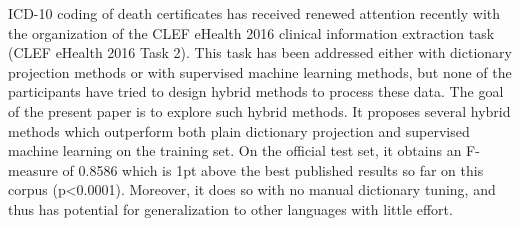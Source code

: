 ICD-10 coding of death certificates has received renewed attention recently with the organization of the CLEF eHealth 2016 clinical information extraction task (CLEF eHealth 2016 Task 2).  This task has been addressed either with dictionary projection methods or with supervised machine learning methods, but none of the participants have tried to design hybrid methods to process these data. The goal of the present paper is to explore such hybrid methods. It proposes several hybrid methods which outperform both plain dictionary projection and supervised machine learning on the training set. On the official test set, it obtains an F-measure of 0.8586 which is 1pt above the best published results so far on this corpus (p<0.0001).  Moreover, it does so with no manual dictionary tuning, and thus has potential for generalization to other languages with little effort.
